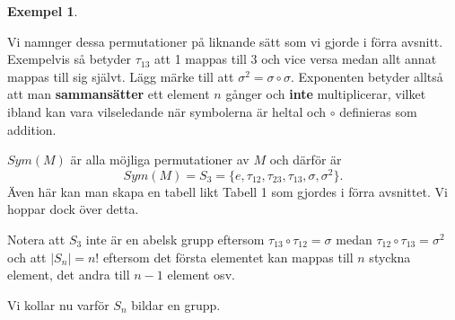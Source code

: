 \documentclass{article}
\theoremstyle{definition}
\newtheorem{exmp}[thm]{Exempel}
\begin{document}
\begin{exmp}
\begin{center}
  \end{center}
  Vi namnger dessa permutationer på liknande sätt som vi gjorde i förra avsnitt. Exempelvis så
  betyder $\tau_{13}$ att 1 mappas till 3 och vice versa medan allt annat mappas till sig självt.
  Lägg märke till att $\sigma^2 = \sigma \circ \sigma.$ Exponenten betyder alltså att man 
  \textbf{sammansätter} ett element $n$ gånger och \textbf{inte} multiplicerar, vilket 
  ibland kan vara vilseledande när symbolerna är heltal och $\circ$ definieras som addition.

  $Sym(M)$ är alla möjliga permutationer av $M$ och därför är 
  \[Sym(M) = S_3 = \{e, \tau_{12}, \tau_{23}, \tau_{13}, \sigma, \sigma^2\}.\]
  Även här kan man skapa en tabell likt Tabell 1 som gjordes i förra avsnittet. Vi hoppar 
  dock över detta. 

  Notera att $S_3$ inte är en abelsk grupp eftersom $\tau_{13} \circ \tau_{12} = \sigma$ medan
  $\tau_{12} \circ \tau_{13} = \sigma^2$ och att $|S_n|= n!$ 
  eftersom det första elementet kan mappas till 
  $n$ styckna element, det andra till $n-1$ element osv.
\end{exmp}
Vi kollar nu varför $S_n$ bildar en grupp.
\end{document}
